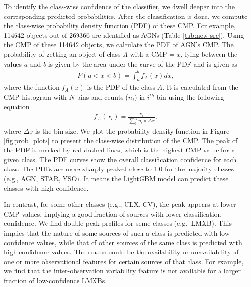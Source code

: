 \documentclass[fleqn,usenatbib]{mnras}
\begin{document}
    To identify the class-wise confidence of the classifier, we dwell deeper into the corresponding predicted probabilities. After the classification is done, we compute the class-wise probability density function (PDF) of these CMP. For example, 114642 objects out of 269366 are identified as AGNs (Table \ref{tab:new-src}). Using the CMP of these 114642 objects, we calculate the PDF of AGN's CMP. 
    The probability of getting an object of class $A$ with a CMP = $x$, lying between the values $a$ and $b$ is given by the area under the curve of the PDF and is given as
    \begin{align}
        P(a<x<b) = \int_a^b f_A(x)dx,
        \label{eq:prob}
    \end{align}
    where the function $f_A(x)$ is the PDF of the class $A$. It is calculated from the CMP histogram with $N$ bins and counts ($n_i$) in $i^{th}$ bin using the following equation
    \begin{align}
        f_A(x_i) = \frac{n_i}{\sum_0^N {n_i} \times \Delta x},
    \end{align}
    where $\Delta x$ is the bin size. We plot the probability density function in Figure \ref{fig:prob_plots} to present the class-wise distribution of the CMP. The peak of the PDF is marked by red dashed lines, which is the highest CMP value for a given class. The PDF curves show the overall classification confidence for each class. The PDFs are more sharply peaked close to 1.0 for the majority classes (e.g., AGN, STAR, YSO). It means the LightGBM model can predict these classes with high confidence. 

    In contrast, for some other classes (e.g., ULX, CV), the peak appears at lower CMP values, implying a good fraction of sources with lower classification confidence. We find double-peak profiles for some classes (e.g., LMXB). This implies that the nature of some sources of such a class is predicted with low confidence values, while that of other sources of the same class is predicted with high confidence values. The reason could be the availability or unavailability of one or more observational features for certain sources of that class. For example, we find that the inter-observation variability feature is not available for a larger fraction of low-confidence LMXBs.
    
\end{document}
